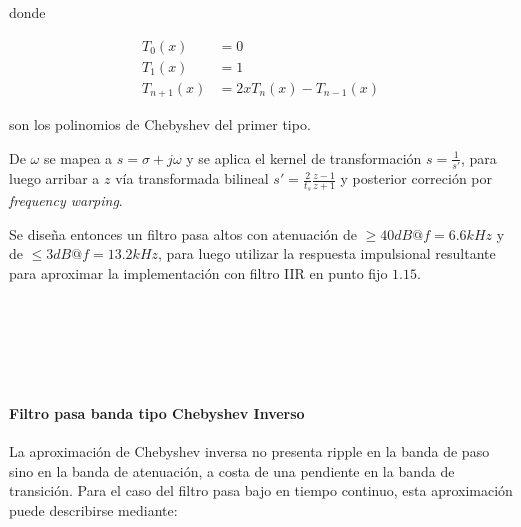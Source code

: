 \documentclass[11pt]{article}
\begin{document}
donde


\begin{align}
T_0(x) &= 0 \\
T_1(x) &= 1 \\
T_{n+1}(x) &= 2x T_n(x) - T_{n-1}(x)
\end{align}


son los polinomios de Chebyshev del primer tipo.

De \(\omega\) se mapea a \(s = \sigma + j\omega\) y se aplica el kernel
de transformación \(s = \frac{1}{s'}\), para luego arribar a \(z\) vía
transformada bilineal \(s' = \frac{2}{t_s} \frac{z - 1}{z + 1}\) y
posterior correción por \emph{frequency warping}.

Se diseña entonces un filtro pasa altos con atenuación de
\(\geq 40 dB @ f = 6.6 kHz\) y de \(\leq 3 dB @ f = 13.2 kHz\), para
luego utilizar la respuesta impulsional resultante para aproximar la
implementación con filtro IIR en punto fijo \(1.15\).


    \begin{center}
    \end{center}
    { \hspace*{\fill} \\}
    

    \begin{center}
    \end{center}
    { \hspace*{\fill} \\}
    

    \begin{center}
    \end{center}
    { \hspace*{\fill} \\}
    
    \paragraph{Filtro pasa banda tipo Chebyshev
Inverso}\label{filtro-pasa-banda-tipo-chebyshev-inverso}

La aproximación de Chebyshev inversa no presenta ripple en la banda de
paso sino en la banda de atenuación, a costa de una pendiente en la
banda de transición. Para el caso del filtro pasa bajo en tiempo
continuo, esta aproximación puede describirse mediante:
\end{document}
